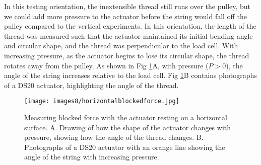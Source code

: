 In this testing orientation, the inextensible thread still runs over the pulley, but we could add more pressure to the actuator before the string would fall off the pulley compared to the vertical experiments. In this orientation, the length of the thread was measured such that the actuator maintained its initial bending angle and circular shape, and the thread was perpendicular to the load cell. With increasing pressure, as the actuator begins to lose its circular shape, the thread rotates away from the pulley. As shown in Fig \ref{fig:horizontalblockedforce}A, with pressure ($P > 0$), the angle of the string increases relative to the load cell. Fig \ref{fig:horizontalblockedforce}B contains photographs of a DS20 actuator, highlighting the angle of the thread. 

\begin{figure}[ht]
    \centering
     \texttt{[image: images8/horizontalblockedforce.jpg]}
    \caption{Measuring blocked force with the actuator resting on a horizontal surface. A. Drawing of how the shape of the actuator changes with pressure, showing how the angle of the thread changes. B. Photographs of a DS20 actuator with an orange line showing the angle of the string with increasing pressure.}
    \label{fig:horizontalblockedforce}
\end{figure}
